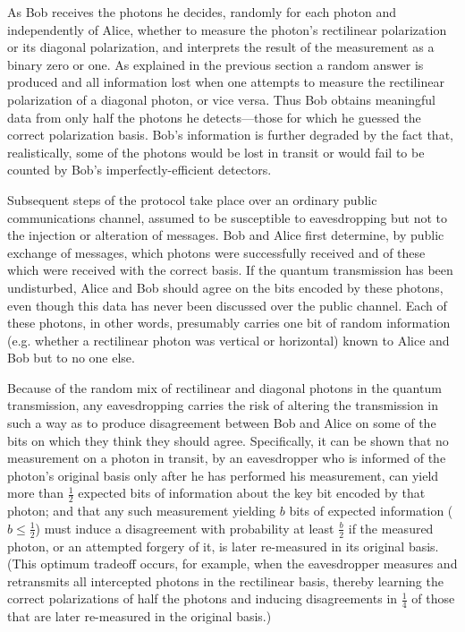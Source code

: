 As Bob receives the photons he decides, randomly for each photon and independently of Alice, whether to measure the photon’s rectilinear polarization or its diagonal polarization, and interprets the result of the measurement as a binary zero or one. As explained in the previous section a random answer is produced and all information lost when one attempts to measure the rectilinear polarization of a diagonal photon, or vice versa. Thus Bob obtains meaningful data from only half the photons he detects—those for which he guessed the correct polarization basis. Bob’s information is further degraded by the fact that, realistically, some of the photons would be lost in transit or would fail to be counted by Bob’s imperfectly-efficient detectors.

Subsequent steps of the protocol take place over an ordinary public communications channel, assumed to be susceptible to eavesdropping but not to the injection or alteration of messages. Bob and Alice first determine, by public exchange of messages, which photons were successfully received and of these which were received with the correct basis. If the quantum transmission has been undisturbed, Alice and Bob should agree on the bits encoded by these photons, even though this data has never been discussed over the public channel. Each of these photons, in other words, presumably carries one bit of random information (e.g. whether a rectilinear photon was vertical or horizontal) known to Alice and Bob but to no one else.

Because of the random mix of rectilinear and diagonal photons in the quantum transmission, any eavesdropping carries the risk of altering the transmission in such a way as to produce disagreement between Bob and Alice on some of the bits on which they think they should agree. Specifically, it can be shown that no measurement on a photon in transit, by an eavesdropper who is informed of the photon’s original basis only after he has performed his measurement, can yield more than $\frac{1}{2}$ expected bits of information about the key bit encoded by that photon; and that any such measurement yielding $b$ bits of expected information ($ b \leq \frac{1}{2}$) must induce a disagreement with probability at least $\frac{b}{2}$ if the measured photon, or an attempted forgery of it, is later re-measured in its original basis. (This optimum tradeoff occurs, for example, when the eavesdropper measures and retransmits all intercepted photons in the rectilinear basis, thereby learning the correct polarizations of half the photons and inducing disagreements in $\frac{1}{4}$ of those that are later re-measured in the original basis.)\textcite{Bennett2014}

